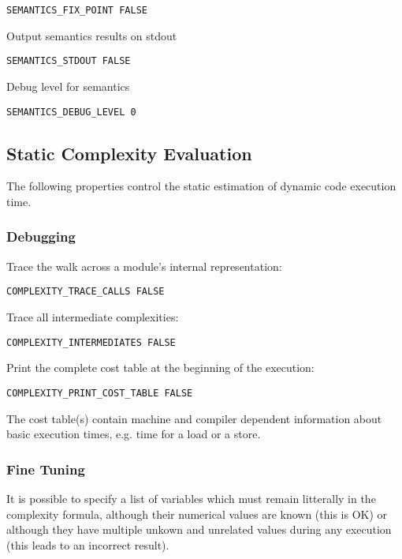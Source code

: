\begin{verbatim}
SEMANTICS_FIX_POINT FALSE
\end{verbatim}

Output semantics results on stdout

\begin{verbatim}
SEMANTICS_STDOUT FALSE
\end{verbatim}

Debug level for semantics

\begin{verbatim}
SEMANTICS_DEBUG_LEVEL 0
\end{verbatim}

\subsection{Static Complexity Evaluation}

The following properties control the static estimation of dynamic code
execution time.

\subsubsection{Debugging}

Trace the walk across a module's internal representation:

\begin{verbatim}
COMPLEXITY_TRACE_CALLS FALSE
\end{verbatim}

Trace all intermediate complexities:

\begin{verbatim}
COMPLEXITY_INTERMEDIATES FALSE
\end{verbatim}

Print the complete cost table at the beginning of the execution:

\begin{verbatim}
COMPLEXITY_PRINT_COST_TABLE FALSE
\end{verbatim}

The cost table(s) contain machine and compiler dependent information
about basic execution times, e.g. time for a load or a store.

\subsubsection{Fine Tuning}

It is possible to specify a list of variables which must remain
litterally in the complexity formula, although their numerical values
are known (this is OK) or although they have multiple unkown and
unrelated values during any execution (this leads to an incorrect
result).

